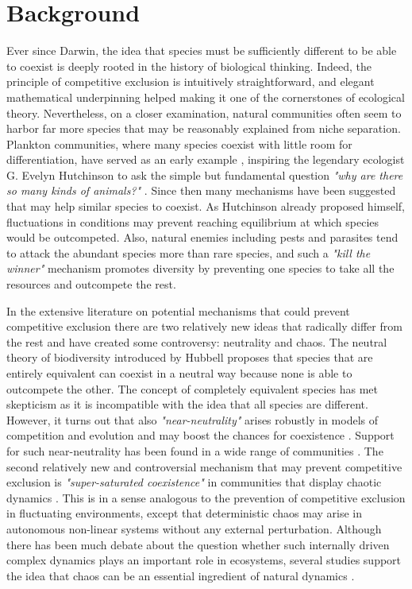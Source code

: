 \section{Background}
\label{sec:Background}
Ever since Darwin, the idea that species must be sufficiently different to be able to coexist is deeply rooted in the history of biological thinking. Indeed, the principle of competitive exclusion is intuitively straightforward, and elegant mathematical underpinning \citep{MacArthur} helped making it one of the cornerstones of ecological theory. Nevertheless, on a closer examination, natural communities often seem to harbor far more species that may be reasonably explained from niche separation. Plankton communities, where many species coexist with little room for differentiation, have served as an early example \citep{Hutchinson, Hutchinson1961}, inspiring the legendary ecologist G. Evelyn Hutchinson to ask the simple but fundamental question \textit{"why are there so many kinds of animals?"} \citep{Hutchinson}. Since then many mechanisms have been suggested that may help similar species to coexist. As Hutchinson already proposed himself, fluctuations in conditions may prevent reaching equilibrium at which species would be outcompeted. Also, natural enemies including pests and parasites tend to attack the abundant species more than rare species, and such a \textit{"kill the winner"} \citep{Winter2010} mechanism promotes diversity by preventing one species to take all the resources and outcompete the rest.

In the extensive literature on potential mechanisms that could prevent competitive exclusion there are two relatively new ideas that radically differ from the rest and have created some controversy: neutrality and chaos. The neutral theory of biodiversity introduced by Hubbell  \citep{Hubbell2001} proposes that species that are entirely equivalent can coexist in a neutral way because none is able to outcompete the other. The concept of completely equivalent species has met skepticism as it is incompatible with the idea that all species are different. However, it turns out that also \textit{"near-neutrality"} arises robustly in models of competition and evolution and may boost the chances for coexistence \citep{Scheffer2006, Scheffer2018, Fort2009, Fort2010}. Support for such near-neutrality has been found in a wide range of communities \citep{Scheffer2006, Vergnon2013, Scheffera, Segura2013, Vergnon2012}. The second relatively new and controversial mechanism that may prevent competitive exclusion is \textit{"super-saturated coexistence"} in communities that display chaotic dynamics \citep{Huisman1999}. This is in a sense analogous to the prevention of competitive exclusion in fluctuating environments, except that deterministic chaos may arise in autonomous non-linear systems without any external perturbation. Although there has been much debate about the question whether such internally driven complex dynamics plays an important role in ecosystems, several studies support the idea that chaos can be an essential ingredient of natural dynamics \citep{Huisman1999, Beninca2008, Dakos2009b}.

